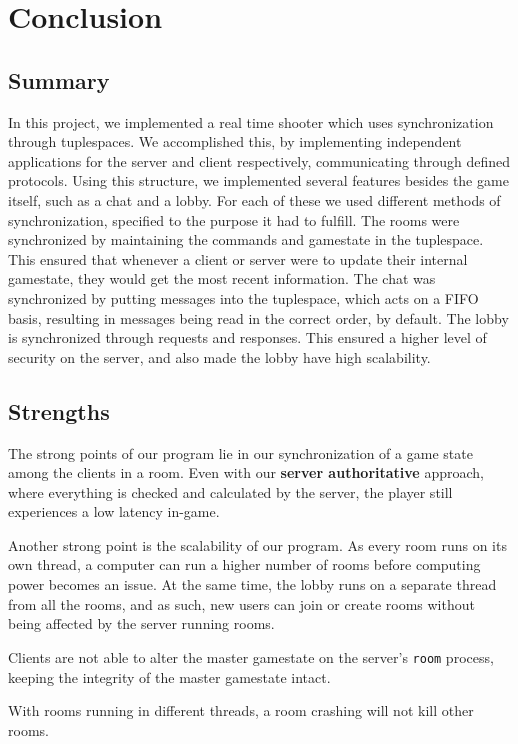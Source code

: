 \chapter{Conclusion}
\section{Summary}
In this project, we implemented a real time shooter which uses synchronization through tuplespaces. We accomplished this, by implementing independent applications for the server and client respectively, communicating through defined protocols. Using this structure, we implemented several features besides the game itself, such as a chat and a lobby. For each of these we used different methods of synchronization, specified to the purpose it had to fulfill. The rooms were synchronized by maintaining the commands and gamestate in the tuplespace. This ensured that whenever a client or server were to update their internal gamestate, they would get the most recent information. The chat was synchronized by putting messages into the tuplespace, which acts on a FIFO basis, resulting in messages being read in the correct order, by default. The lobby is synchronized through requests and responses. This ensured a higher level of security on the server, and also made the lobby have high scalability.

\section{Strengths}

The strong points of our program lie in our synchronization of a game state among the clients in a room. Even with our \textbf{server authoritative} approach, where everything is checked and calculated by the server, the player still experiences a low latency in-game. 

Another strong point is the scalability of our program. As every room runs on its own thread, a computer can run a higher number of rooms before computing power becomes an issue. At the same time, the lobby runs on a separate thread from all the rooms, and as such, new users can join or create rooms without being affected by the server running rooms.

Clients are not able to alter the master gamestate on the server's \texttt{room} process, keeping the integrity of the master gamestate intact. 

With rooms running in different threads, a room crashing will not kill other rooms. 


